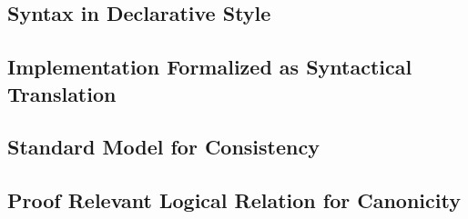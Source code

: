 






\subsection{Syntax in Declarative Style}





\subsection{Implementation Formalized as Syntactical Translation}



\subsection{Standard Model for Consistency}




\subsection{Proof Relevant Logical Relation for Canonicity}

